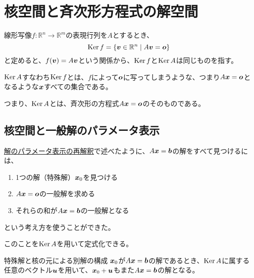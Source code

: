 \documentclass[../../../topic_linear-algebra]{subfiles}
\begin{document}
\sectionline
\section{核空間と斉次形方程式の解空間}

線形写像$f\colon \mathbb{R}^n \to \mathbb{R}^m$の表現行列を$A$とするとき、
\begin{equation*}
  \operatorname{Ker} f = \{ \vb*{v} \in \mathbb{R}^n \mid A\vb*{v} = \vb*{o} \}
\end{equation*}
と定めると、$f(\vb*{v}) = A\vb*{v}$という関係から、$\operatorname{Ker} f$と$\operatorname{Ker} A$は同じものを指す。

\br

$\operatorname{Ker} A$すなわち$\operatorname{Ker} f$とは、$f$によって$\vb*{o}$に写ってしまうような、つまり$A\vb*{x}=\vb*{o}$となるような$\vb*{x}$すべての集合である。

\br

つまり、$\operatorname{Ker} A$とは、斉次形の方程式$A\vb*{x} = \vb*{o}$のそのものである。

\subsection{核空間と一般解のパラメータ表示}

\hyperref[sec:reinterpretation-of-parametric-solution]{解のパラメータ表示の再解釈}で述べたように、$A\vb*{x} = \vb*{b}$の解をすべて見つけるには、
\begin{enumerate}
  \item 1つの解（特殊解）$\vb*{x}_0$を見つける
  \item $A\vb*{x} = \vb*{o}$の一般解を求める
  \item それらの和が$A\vb*{x} = \vb*{b}$の一般解となる
\end{enumerate}
という考え方を使うことができた。

\br

このことを$\operatorname{Ker} A$を用いて定式化できる。

\begin{theorem*}{特殊解と核の元による別解の構成}
  $\vb*{x}_0$が$A\vb*{x} = \vb*{b}$の解であるとき、$\operatorname{Ker} A$に属する任意のベクトル$\vb*{u}$を用いて、$\vb*{x}_0 + \vb*{u}$もまた$A\vb*{x} = \vb*{b}$の解となる。
\end{theorem*}
\end{document}
